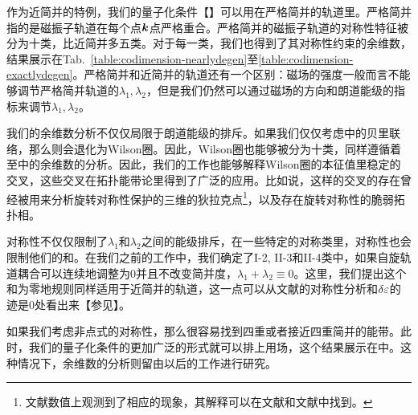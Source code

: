 作为近简并的特例，我们的量子化条件【】可以用在严格简并的轨道里。严格简并指的是磁振子轨道在每个点$\boldsymbol{k}$点严格重合。严格简并的磁振子轨道的对称性特征被分为十类，比近简并多五类。对于每一类，我们也得到了其对称性约束的余维数，结果展示在Tab.\ \ref{table:codimension-nearlydegen}至\ref{table:codimension-exactlydegen}。严格简并和近简并的轨道还有一个区别：磁场的强度一般而言不能够调节严格简并轨道的$\lambda_1,\lambda_2$，但是我们仍然可以通过磁场的方向和朗道能级的指标来调节$\lambda_1,\lambda_2$。


我们的余维数分析不仅仅局限于朗道能级的排斥。如果我们仅仅考虑中的贝里联络，那么则会退化为Wilson圈\cite{wilczek_appearance_1984}。因此，Wilson圈也能够被分为十类，同样遵循着至中的余维数的分析。因此，我们的工作也能够解释Wilson圈的本征值里稳定的交叉，这些交叉在拓扑能带论里得到了广泛的应用。比如说，这样的交叉的存在曾经被用来分析旋转对称性保护的三维的狄拉克点\footnote{文献数值上观测到了相应的现象，其解释可以在文献和文献中找到。}，以及存在旋转对称性的脆弱拓扑相\cite{bouhon_wilson_2018,bradlyn_disconnected_2018}。


对称性不仅仅限制了$\lambda_1$和$\lambda_2$之间的能级排斥，在一些特定的对称类里，对称性也会限制他们的和。在我们之前的工作中\cite{100p,topoferm}，我们确定了I-2, II-3和II-4类中，如果自旋轨道耦合可以连续地调整为0并且不改变简并度，$\lambda_1{+}\lambda_2{\equiv}0$。这里，我们提出这个和为零地规则同样适用于近简并的轨道，这一点可以从文献的对称性分析和$\delta\varepsilon$的迹是0处看出来【参见】。

如果我们考虑非点式的对称性，那么很容易找到四重或者接近四重简并的能带\cite{michel_elementary_2001,wang_hourglass_2016,bradlyn_topological_2017}。此时，我们的量子化条件的更加广泛的形式就可以排上用场，这个结果展示在中。这种情况下，余维数的分析则留由以后的工作进行研究。
